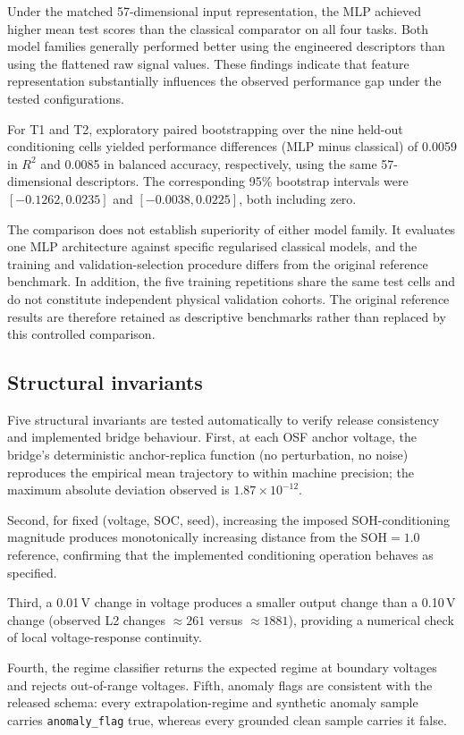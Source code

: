 \documentclass[11pt]{article}
\begin{document}
Under the matched 57-dimensional input representation,
the MLP achieved higher mean test scores than the
classical comparator on all four tasks. Both model
families generally performed better using the engineered
descriptors than using the flattened raw signal values.
These findings indicate that feature representation
substantially influences the observed performance gap
under the tested configurations.

For T1 and T2, exploratory paired bootstrapping over
the nine held-out conditioning cells yielded performance differences (MLP minus classical) of 0.0059 in $R^2$ and 0.0085 in
balanced accuracy, respectively, using the same
57-dimensional descriptors. The corresponding 95\%
bootstrap intervals were $[-0.1262,0.0235]$ and
$[-0.0038,0.0225]$, both including zero.

The comparison does not establish superiority of either
model family. It evaluates one MLP architecture against
specific regularised classical models, and the training
and validation-selection procedure differs from the
original reference benchmark. In addition, the five
training repetitions share the same test cells and do
not constitute independent physical validation cohorts.
The original reference results are therefore retained
as descriptive benchmarks rather than replaced by
this controlled comparison.

\subsection*{Structural invariants}

Five structural invariants are tested automatically to verify release
consistency and implemented bridge behaviour. First, at each OSF anchor
voltage, the bridge's deterministic anchor-replica function (no perturbation,
no noise) reproduces the empirical mean trajectory to within machine
precision; the maximum absolute deviation observed is
$1.87 \times 10^{-12}$.

Second, for fixed (voltage, SOC, seed), increasing the imposed
SOH-conditioning magnitude produces monotonically increasing distance from
the SOH${=}1.0$ reference, confirming that the implemented conditioning
operation behaves as specified.

Third, a 0.01\,V change in voltage produces a smaller output change than a
0.10\,V change (observed L2 changes $\approx 261$ versus $\approx 1881$),
providing a numerical check of local voltage-response continuity.

Fourth, the regime classifier returns the expected regime at boundary
voltages and rejects out-of-range voltages. Fifth, anomaly flags are
consistent with the released schema: every extrapolation-regime and synthetic
anomaly sample carries \texttt{anomaly\_flag} true, whereas every grounded
clean sample carries it false.
\end{document}
